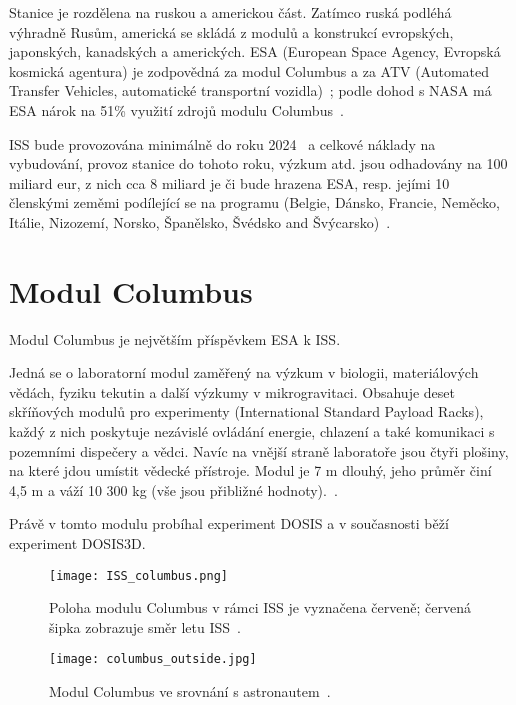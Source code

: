 Stanice je rozdělena na ruskou a americkou část. Zatímco ruská podléhá výhradně Rusům, americká se skládá z modulů a konstrukcí evropských, japonských, kanadských a amerických. ESA (European Space Agency, Evropská kosmická agentura) je zodpovědná za modul Columbus a za ATV (Automated Transfer Vehicles, automatické transportní vozidla)~\cite{ISS_about}; podle dohod s NASA má ESA nárok na 51\% využití zdrojů modulu Columbus~\cite{ISS_wiki}.

ISS bude provozována minimálně do roku 2024~\cite{ISS_prodlouzeni} a celkové náklady na vybudování, provoz stanice do tohoto roku, výzkum atd. jsou odhadovány na 100 miliard eur, z nich cca 8 miliard je či bude hrazena ESA, resp. jejími 10 členskými zeměmi podílející se na programu (Belgie, Dánsko, Francie, Neměcko, Itálie, Nizozemí, Norsko, Španělsko, Švédsko and Švýcarsko)~\cite{ISS_cost}.
\section{Modul Columbus}\label{sec:ISS_columbus}
Modul Columbus je největším příspěvkem ESA k ISS.

Jedná se o laboratorní modul zaměřený na výzkum v biologii, materiálových vědách, fyziku tekutin a další výzkumy v mikrogravitaci. Obsahuje deset skříňových modulů pro experimenty (International Standard Payload Racks), každý z nich poskytuje nezávislé ovládání energie, chlazení a také komunikaci s pozemními dispečery a vědci. Navíc na vnější straně laboratoře jsou čtyři plošiny, na které jdou umístit vědecké přístroje. Modul je 7 m dlouhý, jeho průměr činí 4,5 m a váží 10 300 kg (vše jsou přibližné hodnoty).~\cite{columbus}.

Právě v tomto modulu probíhal experiment DOSIS a v současnosti běží experiment DOSIS3D. 
\begin{figure}[H]
  \centering
  \texttt{[image: ISS\_columbus.png]}
  \caption{Poloha modulu Columbus v rámci ISS je vyznačena červeně; červená šipka zobrazuje směr letu ISS~\cite{dosis}.}
  \label{fig:columbus_poloha}
\end{figure}
\begin{figure}[H]
  \centering
  \texttt{[image: columbus\_outside.jpg]}
  \caption{Modul Columbus ve srovnání s astronautem~\cite{columbus_outside}.}
  \label{fig:columbus_srovnani}
\end{figure}

